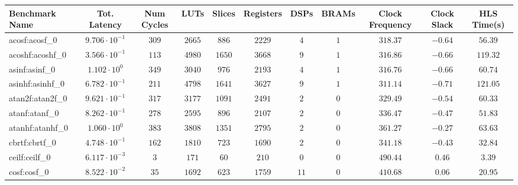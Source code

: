 \begin{tabular}{|l|c|c|c|c|c|c|c|c|c|c|}
\hline
Benchmark Name               & Tot. Latency            & Num Cycles & LUTs      & Slices    & Registers & DSPs    & BRAMs & Clock Frequency & Clock Slack & HLS Time(s) \\
\hline
acosf:acosf\_0               & $ 9.706 \cdot 10^{-1} $ & $ 309    $ & $ 2665  $ & $ 886   $ & $ 2229  $ & $ 4   $ & $ 1 $ & $ 318.37      $ & $ -0.64   $ & $ 56.39   $ \\
acoshf:acoshf\_0             & $ 3.566 \cdot 10^{-1} $ & $ 113    $ & $ 4980  $ & $ 1650  $ & $ 3668  $ & $ 9   $ & $ 1 $ & $ 316.86      $ & $ -0.66   $ & $ 119.32  $ \\
asinf:asinf\_0               & $ 1.102 \cdot 10^{0}  $ & $ 349    $ & $ 3040  $ & $ 976   $ & $ 2193  $ & $ 4   $ & $ 1 $ & $ 316.76      $ & $ -0.66   $ & $ 60.74   $ \\
asinhf:asinhf\_0             & $ 6.782 \cdot 10^{-1} $ & $ 211    $ & $ 4798  $ & $ 1641  $ & $ 3627  $ & $ 9   $ & $ 1 $ & $ 311.14      $ & $ -0.71   $ & $ 121.05  $ \\
atan2f:atan2f\_0             & $ 9.621 \cdot 10^{-1} $ & $ 317    $ & $ 3177  $ & $ 1091  $ & $ 2491  $ & $ 2   $ & $ 0 $ & $ 329.49      $ & $ -0.54   $ & $ 60.33   $ \\
atanf:atanf\_0               & $ 8.262 \cdot 10^{-1} $ & $ 278    $ & $ 2595  $ & $ 896   $ & $ 2107  $ & $ 2   $ & $ 0 $ & $ 336.47      $ & $ -0.47   $ & $ 51.83   $ \\
atanhf:atanhf\_0             & $ 1.060 \cdot 10^{0}  $ & $ 383    $ & $ 3808  $ & $ 1351  $ & $ 2795  $ & $ 2   $ & $ 0 $ & $ 361.27      $ & $ -0.27   $ & $ 63.63   $ \\
cbrtf:cbrtf\_0               & $ 4.748 \cdot 10^{-1} $ & $ 162    $ & $ 1810  $ & $ 723   $ & $ 1690  $ & $ 2   $ & $ 0 $ & $ 341.18      $ & $ -0.43   $ & $ 32.84   $ \\
ceilf:ceilf\_0               & $ 6.117 \cdot 10^{-3} $ & $ 3      $ & $ 171   $ & $ 60    $ & $ 210   $ & $ 0   $ & $ 0 $ & $ 490.44      $ & $ 0.46    $ & $ 3.39    $ \\
cosf:cosf\_0                 & $ 8.522 \cdot 10^{-2} $ & $ 35     $ & $ 1692  $ & $ 623   $ & $ 1759  $ & $ 11  $ & $ 0 $ & $ 410.68      $ & $ 0.06    $ & $ 20.95   $ \\

\end{tabular}
